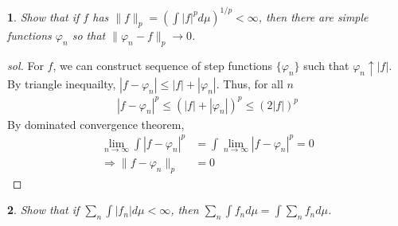 \documentclass{report}
\newtheorem{ex}{}[section]
\begin{document}
\begin{ex}
Show that if $f$ has $\|f\|_p = (\int |f|^pd\mu)^{1/p} < \infty$, then there are simple functions $\varphi_n$ so that $\|\varphi_n - f\|_p \to 0$.
\end{ex}
\begin{proof}[sol]
For $f$, we can construct sequence of step functions $\{\varphi_n\}$ such that $\varphi_n \uparrow |f|$. By triangle inequailty, $|f - \varphi_n| \le |f| + |\varphi_n|$. Thus, for all $n$
\begin{align*}
    |f - \varphi_n|^p \le (|f| + |\varphi_n|)^p \le (2|f|)^p
\end{align*}
By dominated convergence theorem,
\begin{align*}
    \lim_{n\to\infty}\int |f - \varphi_n|^p &= \int \lim_{n\to\infty}|f - \varphi_n|^p = 0\\
    \Rightarrow \|f - \varphi_n\|_p &= 0
\end{align*}
\end{proof}
\begin{ex}
Show that if $\sum_n \int |f_n|d\mu < \infty$, then $\sum_n \int f_n d\mu = \int \sum_n f_n d\mu$.
\end{ex}
\end{document}
